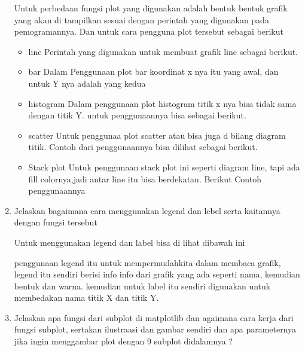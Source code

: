 \begin{enumerate}
Untuk perbedaan fungsi plot yang digunakan adalah bentuk bentuk grafik yang akan di tampilkan sesuai dengan perintah yang digunakan pada pemogramannya.
Dan untuk cara pengguna plot tersebut sebagai berikut
\begin{itemize}
    \item line
    Perintah yang digunakan untuk membuat grafik line sebagai berikut.
    
    \item bar
    Dalam Penggunaan plot bar koordinat x nya itu yang awal, dan untuk Y nya adalah yang kedua
    
    \item histogram
    Dalam penggunaan plot histogram titik x nya bisa tidak sama dengan titik Y.
    untuk penggunaannya bisa sebagai berikut.
    
    \item scatter
    Untuk penggunaa plot scatter atau bisa juga d bilang diagram titik.
    Contoh dari penggunaannya bisa dilihat sebagai berikut.
    
    \item Stack plot
    Untuk penggunaan stack plot ini seperti diagram line, tapi ada fill colornya,jadi antar line itu bisa berdekatan.
    Berikut Contoh penggunaannya
    
\end{itemize} 

\item Jelaskan bagaimana cara menggunakan legend dan lebel serta kaitannya dengan fungsi tersebut 

Untuk menggunakan legend dan label bisa di lihat dibawah ini

penggunaan legend itu untuk mempermudahkita dalam membaca grafik, legend itu sendiri berisi info info dari grafik yang ada seperti nama, kemudian bentuk dan warna.
kemudian untuk label itu sendiri digunakan untuk membedakan nama titik X dan titik Y.

\item Jelaskan apa fungsi dari subplot di matplotlib dan agaimana cara kerja dari fungsi subplot, sertakan ilustraasi dan gambar sendiri dan apa parameternya jika ingin menggambar plot dengan 9 subplot didalamnya ? 


\end{enumerate}
